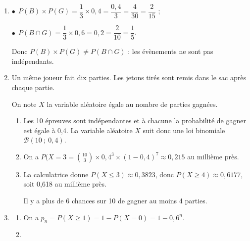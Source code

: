 \begin{enumerate}
\begin{enumerate}
Il faut trouver $P_G(B) = \dfrac{P(G \cap B)}{P(G)} = \dfrac{P(B \cap G)}{P(G)} = \dfrac{0,2}{0,4} = \dfrac2 = 0,5$.
	\end{enumerate}
\item %
$\bullet~~$$P(B) \times P(G) = \dfrac13 \times 0,4 = \dfrac{0,4}{3} = \dfrac{4}{30} = \dfrac{2}{15}$ ;

$\bullet~~$$P(B \cap G) = \dfrac13 \times 0,6 = 0,2 = \dfrac{2}{10} = \dfrac15$.

Donc $P(B) \times P(G) \ne P(B \cap G)$ : les évènements ne sont pas indépendants.
\item Un même joueur fait dix parties. Les jetons tirés sont remis dans le sac après chaque partie.

On note $X$ la variable aléatoire égale au nombre de parties gagnées.
	\begin{enumerate}
		\item %
	Les 10 épreuves sont indépendantes et à chacune la probabilité de gagner est égale à 0,4. La variable aléatoire $X$ suit donc une loi binomiale $\mathcal{B}(10~;~0,4)$.
		\item %
On a $P(X = 3 = \binom{10}{3} \times 0,4^3 \times (1 - 0,4)^7 \approx 0,215$ au millième près.
		\item %
		La calculatrice donne $P(X \leqslant 3) \approx 0,3823$, donc $P(X \geqslant 4) \approx 0,6177$, soit 0,618 au millième près.
		

Il y a plus de 6 chances sur 10 de gagner au moins 4 parties.
	\end{enumerate}
\item %
	\begin{enumerate}
		\item %
On a $p_n = P(X \geqslant 1) = 1 - P(X = 0) = 1 - 0,6^n$.
		\item %
		

\end{enumerate}
\end{enumerate}
